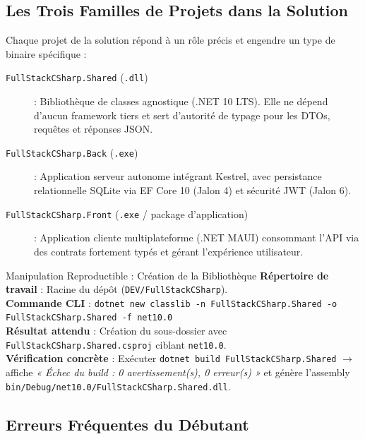 \documentclass[a4paper,11pt]{report}
\begin{document}
\newpage

\subsection*{Les Trois Familles de Projets dans la Solution}

Chaque projet de la solution répond à un rôle précis et engendre un type de binaire spécifique :

\begin{description}
    \item[\color{cyanproj!90!black}\texttt{FullStackCSharp.Shared} (\texttt{.dll})] : Bibliothèque de classes agnostique (.NET 10 LTS). Elle ne dépend d'aucun framework tiers et sert d'autorité de typage pour les DTOs, requêtes et réponses JSON.
    \item[\color{secondary}\texttt{FullStackCSharp.Back} (\texttt{.exe})] : Application serveur autonome intégrant Kestrel, avec persistance relationnelle SQLite via EF Core 10 (Jalon 4) et sécurité JWT (Jalon 6).
    \item[\color{indigo}\texttt{FullStackCSharp.Front} (\texttt{.exe} / package d'application)] : Application cliente multiplateforme (.NET MAUI) consommant l'API via des contrats fortement typés et gérant l'expérience utilisateur.
\end{description}

\vspace{0.3cm}

\begin{bestpracticebox}{Manipulation Reproductible : Création de la Bibliothèque}
\textbf{Répertoire de travail} : Racine du dépôt (\texttt{DEV/FullStackCSharp}).\\[2pt]
\textbf{Commande CLI} : \texttt{dotnet new classlib -n FullStackCSharp.Shared -o FullStackCSharp.Shared -f net10.0}\\[2pt]
\textbf{Résultat attendu} : Création du sous-dossier avec \texttt{FullStackCSharp.Shared.csproj} ciblant \texttt{net10.0}.\\[2pt]
\textbf{Vérification concrète} : Exécuter \texttt{dotnet build FullStackCSharp.Shared} $\longrightarrow$ affiche \textit{« Échec du build : 0 avertissement(s), 0 erreur(s) »} et génère l'assembly \texttt{bin/Debug/net10.0/FullStackCSharp.Shared.dll}.
\end{bestpracticebox}

\vspace{0.2cm}

\subsection*{Erreurs Fréquentes du Débutant}
\end{document}
